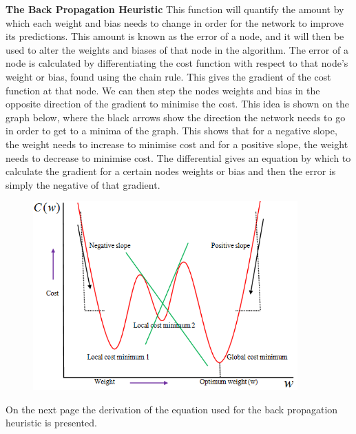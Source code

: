 \documentclass{report}
\begin{document}
\noindent
\textbf{The Back Propagation Heuristic}
\newline
This function will quantify the amount by which each weight and bias needs to change in order for the network to improve its predictions. This amount is known as the error of a node, and it will then be used to alter the weights and biases of that node in the  algorithm.
\newline
The error of a node is calculated by differentiating the cost function with respect to that node's weight or bias, found using the chain rule. This gives the gradient of the cost function at that node. We can then step the nodes weights and bias in the opposite direction of the gradient to minimise the cost. This idea is shown on the graph below, where the black arrows show the direction the network needs to go in order to get to a minima of the graph. This shows that for a negative slope, the weight needs to increase to minimise cost and for a positive slope, the weight needs to decrease to minimise cost. The differential gives an equation by which to calculate the gradient for a certain nodes weights or bias and then the error is simply the negative of that gradient.
\begin{figure}[H]
    \centering
    \includegraphics[width=4in]{Cost-Weight Explanatory Diagram.png}
    \label{fig:Cost-Weight Explanatory Diagram}
\end{figure}
\noindent On the next page the derivation of the equation used for the back propagation heuristic is presented.
\newpage
\end{document}
